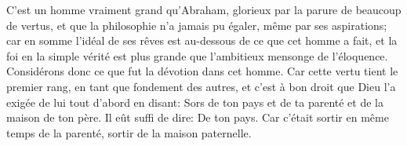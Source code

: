 C’est un homme vraiment grand qu’Abraham,
	glorieux par la parure de beaucoup de vertus,
	et que la philosophie n’a jamais pu égaler, même par ses aspirations;
	car en somme l’idéal de ses rêves
		est au-dessous de ce que cet homme a fait,
	et la foi en la simple vérité
		est plus grande que l’ambitieux mensonge de l’éloquence.
Considérons donc ce que fut la dévotion dans cet homme.
Car cette vertu tient le premier rang, en tant que fondement des autres,
	et c’est à bon droit que Dieu l’a exigée de lui tout d’abord en disant:
	Sors de ton pays et de ta parenté et de la maison de ton père.
Il eût suffi de dire: De ton pays.
	Car c’était sortir en même temps de la parenté,
	sortir de la maison paternelle.
